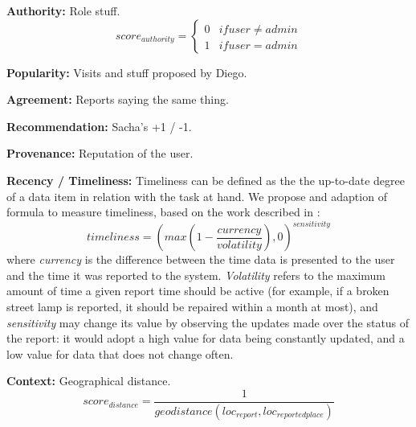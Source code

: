 \textbf{Authority:} Role stuff.
\begin{equation}
score_{authority} = \left\{\begin{matrix}
0 & if user \neq admin \\
1 & if user = admin
\end{matrix}\right.
\end{equation}

\textbf{Popularity:} Visits and stuff proposed by Diego.

\textbf{Agreement:} Reports saying the same thing.

\textbf{Recommendation:} Sacha's +1 / -1.

\textbf{Provenance:} Reputation of the user.

\textbf{Recency / Timeliness:} Timeliness can be defined as the the up-to-date degree of a data item in relation with the task at hand. We propose and adaption of \cite{Hartig09usingweb} formula to measure timeliness, based on the work described in \cite{Ballou:1998:MIM:291329.291335}:
%
\begin{equation}
    timeliness = (max(1-\frac{currency}{volatility}), 0)^{sensitivity}
\end{equation}
%
where \emph{currency} is the difference between the time data is presented to the user and the time it was reported to the system. \emph{Volatility} refers to the maximum amount of time a given report time should be active (for example, if a broken street lamp is reported, it should be repaired within a month at most), and \emph{sensitivity} may change its value by observing the updates made over the status of the report: it would adopt a high value for data being constantly updated, and a low value for data that does not change often.

\textbf{Context:} Geographical distance.
\begin{equation}
score_{distance} = \frac{1}{geodistance(loc_{report}, loc_{reportedplace})}
\end{equation}
